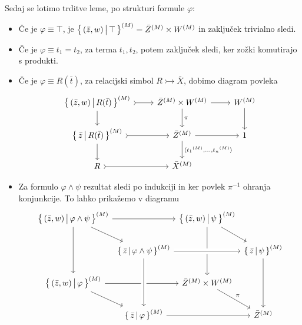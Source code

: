 \documentclass[../kategoricna_logika.tex]{subfiles}
\begin{document}
\begin{dokaz}
\begin{itemize}
    \end{itemize}
    Sedaj se lotimo trditve leme, po strukturi formule $\varphi$:
    \begin{itemize}
    \item Če je $\varphi \equiv \top$, je
      $\left\lbrace\,(\bar{z}, w) \,\middle|\, \top\,\right\rbrace^{(M)} = {\bar{Z}}^{(M)}
      \times {W}^{(M)}$ in zaključek trivialno sledi.
      
    \item Če je $\varphi \equiv t_1 = t_2$, za terma $t_1, t_2$, potem
      zaključek sledi, ker zožki komutirajo s produkti.
      
    \item Če je $\varphi \equiv R(\bar{t})$, za relacijski simbol
      $R \rightarrowtail \bar{X}$, dobimo diagram povleka
      \begin{equation*}
        \begin{tikzcd}[column sep=normal]
          \set{(\bar{z},w) \,\middle|\, R(\bar{t})}^{(M)} \ar[d]
          \ar[r, tail] &
          \interp{\bar{Z}} \times \interp{W} \ar[d, "\pi"] \ar[r] & \interp{W} \ar[d] \\
          \set{\bar{z} \,\middle|\, R(\bar{t})}^{(M)} \ar[d] \ar[r,
          tail] &
          \interp{\bar{Z}} \ar[d, "\fprod{\interp{t_1}, \ldots, \interp{t_n}}"] \ar[r] & 1 \\
          R \ar[r, tail] & \interp{\bar{X}}
        \end{tikzcd}
      \end{equation*}
      
    \item Za formulo $\varphi \land \psi$ rezultat sledi po indukciji
      in ker povlek $\pi^{-1}$ ohranja konjunkcije.  To lahko
      prikažemo v diagramu
      \begin{equation*}
        \begin{tikzcd}[row sep=normal, column sep=0.2em]
          \setb{(\bar{z}, w)}{\varphi \land \psi}^{(M)} \ar[dd]
          \ar[dr] \ar[rr] & &
          \setb{(\bar{z}, w)}{\psi}^{(M)} \ar[dd] \ar[dr] \\
          & \setb{\bar{z}}{\varphi \land \psi}^{(M)} \ar[rr, crossing
          over] & &
          \setb{\bar{z}}{\psi}^{(M)} \ar[dd] \\
          \setb{(\bar{z}, w)}{\varphi}^{(M)} \ar[dr] \ar[rr] & &
          \bar{Z}^{(M)} \times \interp{W} \ar[dr, "\pi"] \\
          & \setb{\bar{z}}{\varphi}^{(M)} \ar[rr] \ar[from=uu,
          crossing over] && \interp{\bar{Z}}
        \end{tikzcd}
      \end{equation*}


\end{itemize}
\end{dokaz}
\end{document}
